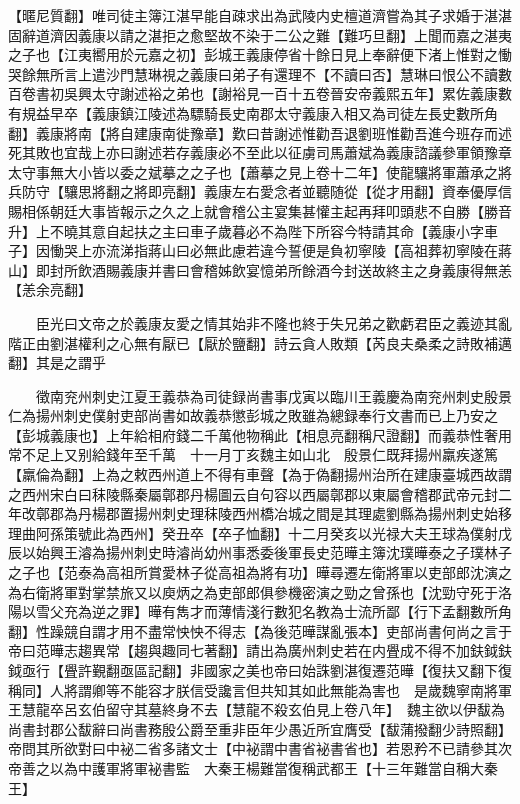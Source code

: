 【暱尼質翻】唯司徒主簿江湛早能自疎求出為武陵内史檀道濟嘗為其子求婚于湛湛固辭道濟因義康以請之湛拒之愈堅故不染于二公之難【難巧旦翻】上聞而嘉之湛夷之子也【江夷嚮用於元嘉之初】彭城王義康停省十餘日見上奉辭便下渚上惟對之慟哭餘無所言上遣沙門慧琳視之義康曰弟子有還理不【不讀曰否】慧琳曰恨公不讀數百卷書初吳興太守謝述裕之弟也【謝裕見一百十五卷晉安帝義熙五年】累佐義康數有規益早卒【義康鎮江陵述為驃騎長史南郡太守義康入相又為司徒左長史數所角翻】義康將南【將自建康南徙豫章】歎曰昔謝述惟勸吾退劉班惟勸吾進今班存而述死其敗也宜哉上亦曰謝述若存義康必不至此以征虜司馬蕭斌為義康諮議參軍領豫章太守事無大小皆以委之斌摹之之子也【蕭摹之見上卷十二年】使龍驤將軍蕭承之將兵防守【驤思將翻之將即亮翻】義康左右愛念者並聽随從【從才用翻】資奉優厚信賜相係朝廷大事皆報示之久之上就會稽公主宴集甚懽主起再拜叩頭悲不自勝【勝音升】上不曉其意自起扶之主曰車子歲暮必不為陛下所容今特請其命【義康小字車子】因慟哭上亦流涕指蔣山曰必無此慮若違今誓便是負初寧陵【高祖葬初寧陵在蔣山】即封所飲酒賜義康并書曰會稽姊飲宴憶弟所餘酒今封送故終主之身義康得無恙【恙余亮翻】

　　臣光曰文帝之於義康友愛之情其始非不隆也終于失兄弟之歡虧君臣之義迹其亂階正由劉湛權利之心無有厭已【厭於鹽翻】詩云貪人敗類【芮良夫桑柔之詩敗補邁翻】其是之謂乎

　　徵南兖州刺史江夏王義恭為司徒録尚書事戊寅以臨川王義慶為南兖州刺史殷景仁為揚州刺史僕射吏部尚書如故義恭懲彭城之敗雖為總録奉行文書而已上乃安之【彭城義康也】上年給相府錢二千萬他物稱此【相息亮翻稱尺證翻】而義恭性奢用常不足上又别給錢年至千萬　十一月丁亥魏主如山北　殷景仁既拜揚州羸疾遂篤【羸倫為翻】上為之敕西州道上不得有車聲【為于偽翻揚州治所在建康臺城西故謂之西州宋白曰秣陵縣秦屬鄣郡丹楊圖云自句容以西屬鄣郡以東屬會稽郡武帝元封二年改鄣郡為丹楊郡置揚州刺史理秣陵西州橋冶城之間是其理處劉縣為揚州刺史始移理曲阿孫策號此為西州】癸丑卒【卒子恤翻】十二月癸亥以光禄大夫王球為僕射戊辰以始興王濬為揚州刺史時濬尚幼州事悉委後軍長史范曄主簿沈璞曄泰之子璞林子之子也【范泰為高祖所賞愛林子從高祖為將有功】曄尋遷左衛將軍以吏部郎沈演之為右衛將軍對掌禁旅又以庾炳之為吏部郎俱參機密演之勁之曾孫也【沈勁守死于洛陽以雪父充為逆之罪】曄有雋才而薄情淺行數犯名教為士流所鄙【行下孟翻數所角翻】性躁競自謂才用不盡常怏怏不得志【為後范曄謀亂張本】吏部尚書何尚之言于帝曰范曄志趨異常【趨與趣同七著翻】請出為廣州刺史若在内舋成不得不加鈇鉞鈇鉞亟行【舋許覲翻亟區記翻】非國家之美也帝曰始誅劉湛復遷范曄【復扶又翻下復稱同】人將謂卿等不能容才朕信受讒言但共知其如此無能為害也　是歲魏寧南將軍王慧龍卒呂玄伯留守其墓終身不去【慧龍不殺玄伯見上卷八年】　魏主欲以伊馛為尚書封郡公馛辭曰尚書務殷公爵至重非臣年少愚近所宜膺受【馛蒲撥翻少詩照翻】帝問其所欲對曰中袐二省多諸文士【中袐謂中書省袐書省也】若恩矜不已請參其次帝善之以為中護軍將軍袐書監　大秦王楊難當復稱武都王【十三年難當自稱大秦王】

